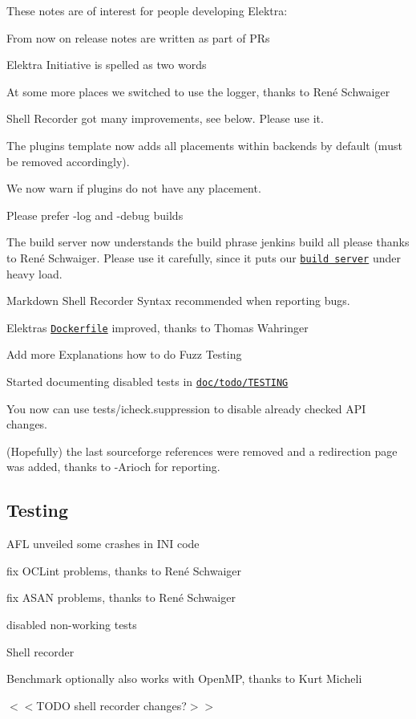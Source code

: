 These notes are of interest for people developing Elektra\+:


\begin{DoxyItemize}
\item From now on release notes are written as part of P\+Rs
\item Elektra Initiative is spelled as two words
\item At some more places we switched to use the logger, thanks to René Schwaiger
\item Shell Recorder got many improvements, see below. Please use it.
\item The plugin\textquotesingle{}s template now adds all placements within backends by default (must be removed accordingly).
\item We now warn if plugins do not have any placement.
\item Please prefer -\/log and -\/debug builds
\item The build server now understands the build phrase {\ttfamily jenkins build all please} thanks to René Schwaiger. Please use it carefully, since it puts our \href{https://build.libelektra.org/}{\tt build server} under heavy load.
\item Markdown Shell Recorder Syntax recommended when reporting bugs.
\item Elektra\textquotesingle{}s \href{https://master.libelektra.org/doc/docker/Dockerfile}{\tt Dockerfile} improved, thanks to Thomas Wahringer
\item Add more Explanations how to do Fuzz Testing
\item Started documenting disabled tests in \href{https://master.libelektra.org/doc/todo/TESTING}{\tt doc/todo/\+T\+E\+S\+T\+I\+NG}
\item You now can use {\ttfamily tests/icheck.\+suppression} to disable already checked A\+PI changes.
\item (Hopefully) the last sourceforge references were removed and a redirection page was added, thanks to -\/\+Arioch for reporting.
\end{DoxyItemize}

\subsection*{Testing}


\begin{DoxyItemize}
\item A\+FL unveiled some crashes in I\+NI code
\item fix O\+C\+Lint problems, thanks to René Schwaiger
\item fix A\+S\+AN problems, thanks to René Schwaiger
\item disabled non-\/working tests
\item Shell recorder
\item Benchmark optionally also works with Open\+MP, thanks to Kurt Micheli
\item $<$$<$T\+O\+DO shell recorder changes?$>$$>$
\end{DoxyItemize}


